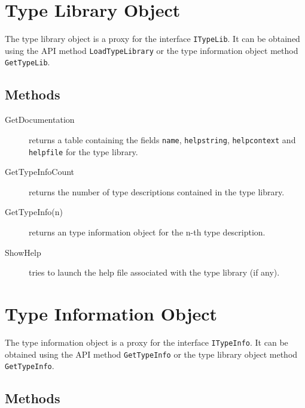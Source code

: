 \documentclass[11pt,a4paper,english]{report}
\newcommand{\ident}[1]{\mbox{\texttt{#1}}}
\begin{document}
\section{Type Library Object}
\label{sec:type-library-object}

The type library object is a proxy for the interface
\ident{ITypeLib}. It can be obtained using the API method
\ident{LoadTypeLibrary} or the type information object method
\ident{GetTypeLib}.

\subsection*{Methods}

\begin{description}

\item[GetDocumentation] returns a table containing the fields
\ident{name}, \ident{helpstring}, \ident{helpcontext} and
\ident{helpfile} for the type library.

\item[GetTypeInfoCount] returns the number of type descriptions
contained in the type library.\

\item[GetTypeInfo(n)] returns an type information object for the n-th
type description.

\item[ShowHelp] tries to launch the help file associated with the type
library (if any).

\end{description}


\section{Type Information Object}
\label{sec:type-inform-object}


The type information object is a proxy for the interface
\ident{ITypeInfo}. It can be obtained using the API method
\ident{GetTypeInfo} or the type library object method
\ident{GetTypeInfo}.

\subsection*{Methods}
\end{document}
